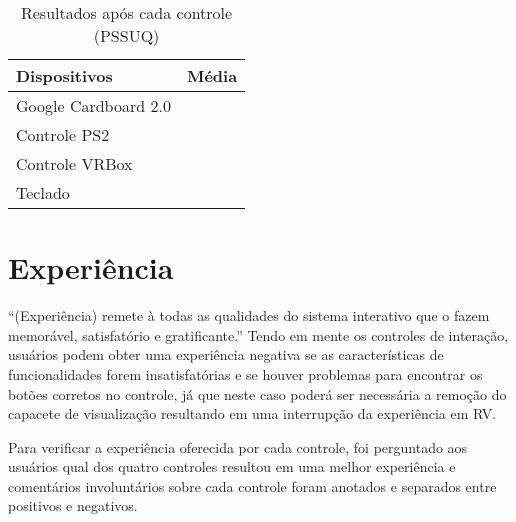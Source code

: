 \begin{table}[H]	
	\caption{Resultados após cada controle (PSSUQ)} 
	\label{t.ASQ} 
	\centering
	\begin{tabular}{l|l}
		\textbf{\small Dispositivos } & \textbf{\small Média}\\\hline
		
		{\small Google Cardboard 2.0} & {\small } \\\hline	
		
		{\small Controle PS2} & {\small } \\\hline		 
		
		{\small Controle VRBox} & {\small }  \\\hline  
		
		{\small Teclado} & {\small } \\\hline	
	\end{tabular}
\end{table}

\section{Experiência}
\label{experiencia}

“(Experiência) remete à todas as qualidades do sistema interativo que o fazem memorável, satisfatório e gratificante.” \cite[tradução nossa]{benyon} Tendo em mente os controles de interação, usuários podem obter uma experiência negativa se as características de funcionalidades forem insatisfatórias e se houver problemas para encontrar os botões corretos no controle, já que neste caso poderá ser necessária a remoção do capacete de visualização resultando em uma interrupção da experiência em RV. 

Para verificar a experiência oferecida por cada controle, foi perguntado aos usuários qual dos quatro controles resultou em uma melhor experiência e comentários involuntários sobre cada controle foram anotados e separados entre positivos e negativos. 

